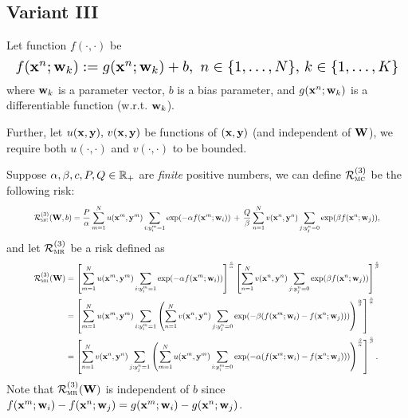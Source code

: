\subsection{Variant III}

Let function $f(\cdot, \cdot)$ be
\begin{equation*}
\resizebox{\linewidth}{!}{$
f(\x^n; \w_k) := g(\x^n; \w_k) + b, \ n \in \{1,\dots,N\}, \, k \in \{1,\dots,K\}
$}
\end{equation*}
where $\mathbf{w}_k$ is a parameter vector, $b$ is a bias parameter, 
and $g(\mathbf{x}^n; \mathbf{w}_k)$ is a differentiable function (w.r.t. $\mathbf{w}_k$).

Further, let $u(\mathbf{x}, \mathbf{y}), \, v(\mathbf{x}, \mathbf{y})$ be functions of $(\mathbf{x}, \mathbf{y})$ (and independent of $\mathbf{W}$), 
we require both $u(\cdot,\cdot)$ and $v(\cdot,\cdot)$ to be bounded.

Suppose $\alpha, \beta, c, P, Q \in \mathbb{R}_+$ are \emph{finite} positive numbers, 
we can define $\mathcal{R}_\textsc{mc}^{({3})}$ be the following risk:
\begin{equation}
\label{eq:mc}
\resizebox{.9\linewidth}{!}{$
\displaystyle
\RCal_\textsc{mc}\pb{3}(\W, b) 
= \frac{P}{\alpha} \sum_{m=1}^N u(\x^m, \y^m) \sum_{i: y_i^m = 1} \exp(-\alpha f(\x^m; \w_i)) \, + \,
  \frac{Q}{\beta}  \sum_{n=1}^N v(\x^n, \y^n) \sum_{j: y_j^n = 0} \exp( \beta  f(\x^n; \w_j)),
$}
\end{equation}
and let $\mathcal{R}_\textsc{mr}^{({3})}$ be a risk defined as
\begin{equation}
\label{eq:mr}
\resizebox{.9\linewidth}{!}{$
\begin{aligned}
\displaystyle
\RCal_\textsc{mr}\pb{3}(\W) 
&= \left[ \sum_{m=1}^N u(\x^m, \y^m) \sum_{i: y_i^m = 1} \exp(-\alpha f(\x^m; \w_i)) \right]^\frac{c}{\alpha}
   \left[ \sum_{n=1}^N v(\x^n, \y^n) \sum_{j: y_j^n = 0} \exp( \beta  f(\x^n; \w_j)) \right]^\frac{c}{\beta} \\
&= \left[ \sum_{m=1}^N u(\x^m, \y^m) \sum_{i: y_i^m = 1} \left( \sum_{n=1}^N v(\x^n, \y^n) \sum_{j: y_j^n = 0}
   \exp(-\beta(f(\x^m; \w_i) - f(\x^n; \w_j))) \right)^\frac{\alpha}{\beta} \right]^\frac{c}{\alpha} \\
&= \left[ \sum_{n=1}^N v(\x^n, \y^n) \sum_{j: y_j^n = 1} \left( \sum_{m=1}^N u(\x^m, \y^m) \sum_{i: y_i^m = 0}
   \exp(-\alpha(f(\x^m; \w_i) - f(\x^n; \w_j))) \right)^\frac{\beta}{\alpha} \right]^\frac{c}{\beta}.
\end{aligned}
$}
\end{equation}
Note that $\mathcal{R}_\textsc{mr}^{({3})}(\mathbf{W})$ is independent of $b$ since 
$f(\mathbf{x}^m; \mathbf{w}_i) - f(\mathbf{x}^n; \mathbf{w}_j) = g(\mathbf{x}^m; \mathbf{w}_i) - g(\mathbf{x}^n; \mathbf{w}_j)$.


